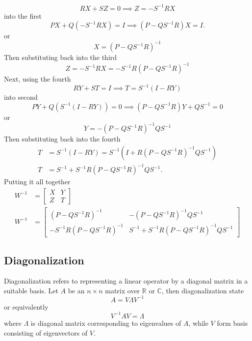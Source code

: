 \documentclass[../../../main.tex]{subfiles}
\begin{document}
\begin{equation*}
	RX + SZ = 0 \implies Z = -S^{-1}RX
\end{equation*}
into the first
\begin{equation*}
	PX + Q(-S^{-1}RX) = I
	\implies
	(P - QS^{-1}R)X = I.
\end{equation*}
or
\begin{equation*}
	X = (P - QS^{-1}R)^{-1}
\end{equation*}
Then substituting back into the third
\begin{equation*}
	Z = -S^{-1}RX = -S^{-1}R(P - QS^{-1}R)^{-1}
\end{equation*}
Next, using the fourth
\begin{equation*}
	RY + ST = I\implies
	T = S^{-1}(I - RY)
\end{equation*}
into second
\begin{equation*}
	PY + Q(S^{-1}(I - RY)) = 0\implies
	(P - QS^{-1}R)Y + QS^{-1} = 0
\end{equation*}
or
\begin{equation*}
	Y = -(P - Q S^{-1} R)^{-1} Q S^{-1}
\end{equation*}
Then  substituting back into the fourth
\begin{align*}
	T & =  S^{-1}(I - RY) = S^{-1}(I + R(P - QS^{-1}R)^{-1}QS^{-1}) \\
	T & =  S^{-1} + S^{-1}R(P - QS^{-1}R)^{-1}QS^{-1}.
\end{align*}
Putting it all together
\begin{align*}
	W^{-1} & =  \begin{bmatrix} X & Y \\ Z & T \end{bmatrix}                                                                                                                \\
	W^{-1} & =  \begin{bmatrix} (P - QS^{-1}R)^{-1} & -(P - QS^{-1}R)^{-1}QS^{-1} \\ -S^{-1}R(P - QS^{-1}R)^{-1} & S^{-1} + S^{-1}R(P - QS^{-1}R)^{-1}QS^{-1} \end{bmatrix}
\end{align*}

\subsection{Diagonalization}
Diagonalization refers to representing a linear operator by a diagonal matrix in a suitable basis.
Let $ A$ be an $n \times  n$ matrix over $\mathbb{R}$ or $\mathbb{C}$, then diagonalization state
\begin{equation*}
	A= V \Lambda V^{-1}
\end{equation*}
or equivalently
\begin{equation*}
	V^{-1}AV= \Lambda
\end{equation*}
where $\Lambda$ is diagonal matrix corresponding to eigenvalues of $A$, while  $V$ form basis consisting of eigenvectors of $V$.
\end{document}
